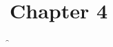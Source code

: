 \chapter{Chapter 4}
\ifpdf
    \graphicspath{{Chapter4/ChapterFigs/PNG/}{Chapter4/ChapterFigs/PDF/}{Chapter4/ChapterFigs/}}
\else
    \graphicspath{{Chapter4/ChapterFigs/EPS/}{Chapter4/ChapterFigs/}}
\f
